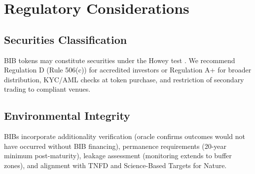 \section{Regulatory Considerations}

\label{sec:regulatory}

\subsection{Securities Classification}

BIB tokens may constitute securities under the Howey test
\citep{sec1946howey}. We recommend Regulation D (Rule 506(c)) for
accredited investors or Regulation A+ for broader distribution,
KYC/AML checks at token purchase, and restriction of secondary trading
to compliant venues.

\subsection{Environmental Integrity}

BIBs incorporate additionality verification (oracle confirms outcomes
would not have occurred without BIB financing), permanence requirements
(20-year minimum post-maturity), leakage assessment (monitoring extends
to buffer zones), and alignment with TNFD \citep{tnfd2023framework} and
Science-Based Targets for Nature.


